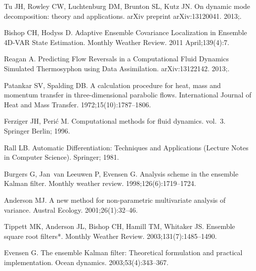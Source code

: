 \documentclass[10pt,letterpaper]{article}
\begin{document}
\begin{thebibliography}{10}
Tu JH, Rowley CW, Luchtenburg DM, Brunton SL, Kutz JN.
\newblock On dynamic mode decomposition: theory and applications.
\newblock arXiv preprint arXiv:13120041. 2013;.

Bishop CH, Hodyss D.
\newblock Adaptive Ensemble Covariance Localization in Ensemble 4D-VAR State
  Estimation.
\newblock Monthly Weather Review. 2011 April;139(4):7.

Reagan A.
\newblock Predicting Flow Reversals in a Computational Fluid Dynamics Simulated
  Thermosyphon using Data Assimilation.
\newblock arXiv:13122142. 2013;.

Patankar SV, Spalding DB.
\newblock A calculation procedure for heat, mass and momentum transfer in
  three-dimensional parabolic flows.
\newblock International Journal of Heat and Mass Transfer.
  1972;15(10):1787--1806.

Ferziger JH, Peri{\'c} M.
\newblock Computational methods for fluid dynamics. vol.~3.
\newblock Springer Berlin; 1996.

Rall LB.
\newblock Automatic Differentiation: Techniques and Applications (Lecture Notes
  in Computer Science).
\newblock Springer; 1981.

Burgers G, Jan~van Leeuwen P, Evensen G.
\newblock Analysis scheme in the ensemble Kalman filter.
\newblock Monthly weather review. 1998;126(6):1719--1724.

Anderson MJ.
\newblock A new method for non-parametric multivariate analysis of variance.
\newblock Austral Ecology. 2001;26(1):32--46.

Tippett MK, Anderson JL, Bishop CH, Hamill TM, Whitaker JS.
\newblock Ensemble square root filters*.
\newblock Monthly Weather Review. 2003;131(7):1485--1490.

Evensen G.
\newblock The ensemble Kalman filter: Theoretical formulation and practical
  implementation.
\newblock Ocean dynamics. 2003;53(4):343--367.

\end{thebibliography}
\end{document}
